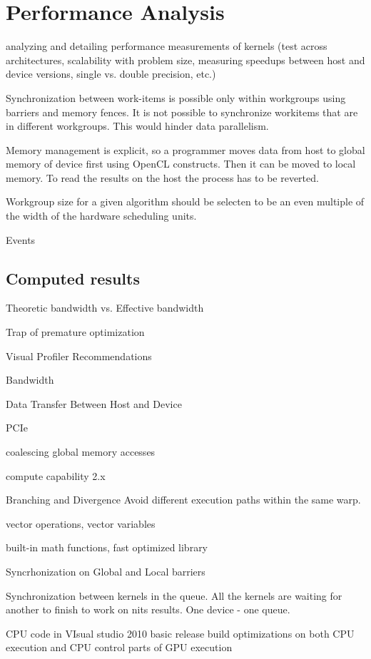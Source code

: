 \chapter{Performance Analysis}

analyzing and detailing performance measurements of kernels (test
across architectures, scalability with problem size, measuring speedups
between host and device versions, single vs. double precision, etc.)


Synchronization between work-items is possible only within workgroups using barriers and memory fences. It is not possible to synchronize workitems that are in different workgroups. This would hinder data parallelism.

Memory management is explicit, so a programmer moves data from host to global memory of device first using OpenCL constructs. Then it can be moved to local memory. To read the results on the host the process has to be reverted.

Workgroup size for a given algorithm should be selecten to be an even multiple of the width of the hardware scheduling units.

Events

\section{Computed results}
Theoretic bandwidth vs. Effective bandwidth

Trap of premature optimization

Visual Profiler Recommendations

Bandwidth

Data Transfer Between Host and Device

PCIe

coalescing global memory accesses

compute capability 2.x

Branching and Divergence
Avoid different execution paths within the same warp.

vector operations, vector variables

built-in math functions, fast optimized library

Syncrhonization on Global and Local barriers

Synchronization between kernels in the queue. All the kernels are waiting for another to finish to work on nits results.
One device - one queue.

CPU code in VIsual studio 2010 basic release build optimizations on both CPU execution and CPU control parts of GPU execution

